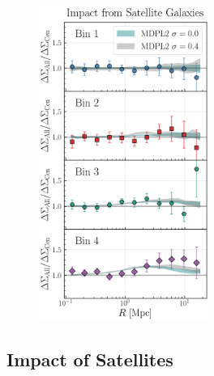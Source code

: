 \documentclass[a4paper,fleqn,usenatbib]{mnras}
\begin{document}
  \begin{figure}
      \centering
      \includegraphics[width=0.49\textwidth]{figure/dsigma_sat_ratio}
      \caption{
          }
      \label{fig:satellite}
  \end{figure}

\subsection{Impact of Satellites}
    \label{sec:satellite}

\end{document}
